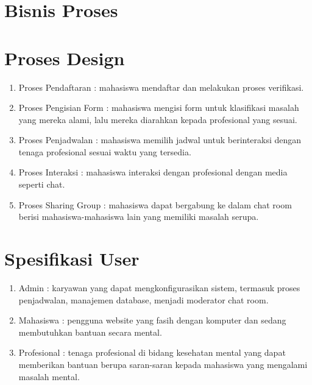 \documentclass{article}
\begin{document}
	\section{Bisnis Proses}
	
	\section{Proses Design}
	\begin{enumerate}
		\item Proses Pendaftaran : mahasiswa mendaftar dan melakukan proses verifikasi.
		\item Proses Pengisian Form : mahasiswa mengisi form untuk  klasifikasi masalah yang mereka alami, lalu mereka diarahkan kepada profesional yang sesuai.
		\item Proses Penjadwalan : mahasiswa memilih jadwal untuk berinteraksi dengan tenaga profesional sesuai waktu yang tersedia.
		\item Proses Interaksi : mahasiswa interaksi dengan profesional dengan media seperti chat.
		\item Proses Sharing Group : mahasiswa dapat bergabung ke dalam chat room berisi mahasiswa-mahasiswa lain yang memiliki masalah serupa.
	\end{enumerate}
	
	\section{Spesifikasi User}
	\begin{enumerate}
		\item Admin : karyawan yang dapat mengkonfigurasikan sistem, termasuk proses penjadwalan, manajemen database, menjadi moderator chat room.
		\item Mahasiswa : pengguna website yang fasih dengan komputer dan sedang membutuhkan bantuan secara mental.
		\item Profesional : tenaga profesional di bidang kesehatan mental yang dapat memberikan bantuan berupa saran-saran kepada mahasiswa yang mengalami masalah mental.
	\end{enumerate}
	
\end{document}
